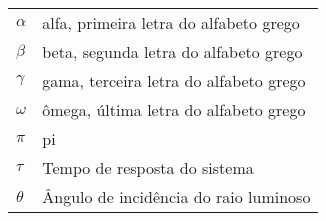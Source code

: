

\begin{listasimb}

\begin{tabular}{ll}
$\alpha$ & alfa, primeira letra do alfabeto grego\\
$\beta$ & beta, segunda letra do alfabeto grego\\
$\gamma$ & gama, terceira letra do alfabeto grego\\
$\omega$ & ômega, última letra do alfabeto grego\\
$\pi$ & pi \\
$\tau$ & Tempo de resposta do sistema\\
$\theta$ & Ângulo de incidência do raio luminoso\\
\end{tabular}

\end{listasimb}

